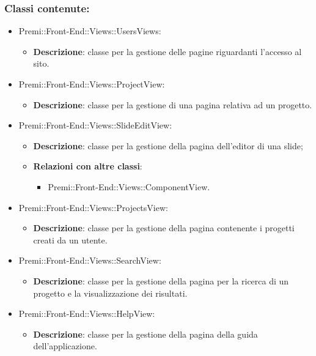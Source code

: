 	\subsubsection*{Classi contenute:}
	\begin{itemize}

		\item Premi::Front-End::Views::UsersViews:
		\begin{itemize}
			\item \textbf{Descrizione}: classe per la gestione delle pagine riguardanti l'accesso al sito.
		\end{itemize}

		\item Premi::Front-End::Views::ProjectView:
		\begin{itemize}
			\item \textbf{Descrizione}: classe per la gestione di una pagina relativa ad un progetto.
		\end{itemize}

		\item Premi::Front-End::Views::SlideEditView:
		\begin{itemize}
			\item \textbf{Descrizione}: classe per la gestione della pagina dell'editor di una \gls{slide};
			\item \textbf{Relazioni con altre classi}:
			\begin{itemize}
				\item Premi::Front-End::Views::ComponentView.
			\end{itemize}
		\end{itemize}

		\item Premi::Front-End::Views::ProjectsView:
		\begin{itemize}
			\item \textbf{Descrizione}: classe per la gestione della pagina contenente i progetti creati da un utente.
		\end{itemize}

		\item Premi::Front-End::Views::SearchView:
		\begin{itemize}
			\item \textbf{Descrizione}: classe per la gestione della pagina per la ricerca di un progetto e la visualizzazione dei risultati.
		\end{itemize}

		\item Premi::Front-End::Views::HelpView:
		\begin{itemize}
			\item \textbf{Descrizione}: classe per la gestione della pagina della guida dell'applicazione.
		\end{itemize}


\end{itemize}
